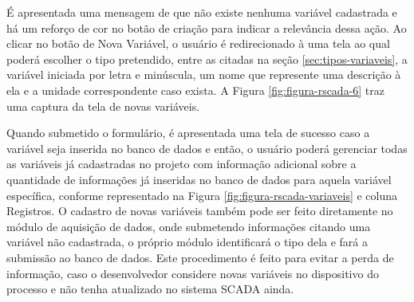 É apresentada uma mensagem de que não existe nenhuma variável cadastrada e há um reforço de cor no botão de criação para indicar a relevância dessa ação. Ao clicar no botão de Nova Variável, o usuário é redirecionado à uma tela ao qual poderá escolher o tipo pretendido, entre as citadas na seção \ref{sec:tipos-variaveis}, a variável iniciada por letra e minúscula, um nome que represente uma descrição à ela e a unidade correspondente caso exista. A Figura \ref{fig:figura-rscada-6} traz uma captura da tela de novas variáveis.

        \begin{figure}[!h]
    	\end{figure}
    	
Quando submetido o formulário, é apresentada uma tela de sucesso caso a variável seja inserida no banco de dados e então, o usuário poderá gerenciar todas as variáveis já cadastradas no projeto com informação adicional sobre a quantidade de informações já inseridas no banco de dados para aquela variável específica, conforme representado na Figura \ref{fig:figura-rscada-variaveis} e coluna Registros. O cadastro de novas variáveis também pode ser feito diretamente no módulo de aquisição de dados, onde submetendo informações citando uma variável não cadastrada, o próprio módulo identificará o tipo dela e fará a submissão ao banco de dados. Este procedimento é feito para evitar a perda de informação, caso o desenvolvedor considere novas variáveis no dispositivo do processo e não tenha atualizado no sistema \gls{SCADA} ainda.

        \begin{figure}[!h]
    	\end{figure}


